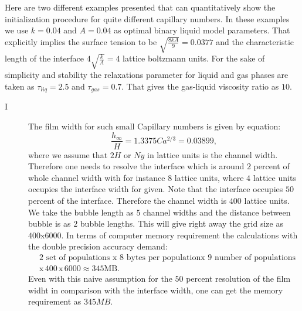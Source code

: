 \documentclass{article}
\begin{document}
Here are two different examples presented that can quantitatively show the
initialization procedure for quite different capillary numbers. In these
examples we use $k=0.04$ and $A=0.04$ as optimal binary liquid model parameters.
That explicitly implies the surface tension to be $\sqrt{\frac{8 k
A}{9}}=0.0377$ and the characteristic length of the interface
$4\sqrt{\frac{k}{A}}=4$ lattice boltzmann units. For the sake of simplicity and
stability the relaxations parameter for liquid and gas phases are taken as
$\tau_{liq}=2.5$ and $\tau_{gas}=0.7$. That gives the gas-liquid viscosity ratio
as $10$.  
\begin{description}
 \item[I ]
  The film width for such small Capillary numbers \cite{bretherton} is
given by equation:
  \begin{equation}
  \frac{h_{\infty}}{H}=1.3375 Ca^{2/3}=0.03899,
  \end{equation}
  where we assume that $2 H$ or $Ny$ in lattice units is the channel width.
Therefore one needs to resolve the interface which is around $2$ percent of
  whole channel width with for instance $8$ lattice units, where $4$ lattice
units occupies the interface width for given. Note that the interface occupies
$50$ percent of the interface.  Therefore the channel
  width is $400$ lattice units. We take the bubble length as $5$ channel widths
  and the distance between bubble is as $2$ bubble lengths. This will give
  right away the grid size as $400\mathrm{x}6000$. In terms of computer memory
requirement the calculations with the double precision accuracy demand:
\begin{equation}
\begin{aligned}
&2\text{ set of populations }\mathrm{x}\,\, 8\,\, \text{bytes per population
}\mathrm{x}\,\, 9 \text{ number of
populations}\\
&\mathrm{x}\,400\,\mathrm{x}\,6000\approx 345 \mathrm{MB}. 
\end{aligned}
\end{equation}
Even with this naive assumption for the $50$ percent resolution of the film
widht in comparison with the interface width, one can get the memory
requirement as $345 MB$. 


\end{description}
\end{document}
